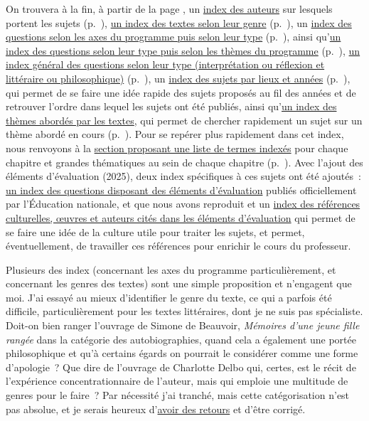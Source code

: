 On trouvera à la fin, à partir de la page \pageref{indexdeb}, un \hyperlink{indexa}{index des auteurs} sur lesquels portent les sujets (p.~\pageref{indexa}), \hyperlink{indexg}{un index des textes selon leur genre} (p.~\pageref{indexg}), 
un \hyperlink{indexw}{index des questions selon les axes du programme puis selon leur type} (p.~\pageref{indexw}), ainsi qu'\hyperlink{indexv}{un index des questions selon leur type puis selon les thèmes du programme} (p.~\pageref{indexv}), \hyperlink{indexq}{un index général des questions selon leur type (interprétation ou réflexion et littéraire ou philosophique)} (p.~\pageref{indexq}), un \hyperlink{indexn}{index des sujets par lieux et années} (p.~\pageref{indexn}), qui permet de se faire une idée rapide des sujets proposés au fil des années et de retrouver l'ordre dans lequel les sujets ont été publiés,  ainsi qu'\hyperlink{indext}{un index des thèmes abordés par les textes}, qui permet de chercher rapidement un sujet sur un thème abordé en cours (p.~\pageref{indext}). Pour se repérer plus rapidement dans cet index, nous renvoyons à la \hyperlink{repere-thematique}{section proposant une liste de termes indexés} pour chaque chapitre et grandes thématiques au sein de chaque chapitre (p.~\pageref{repere-thematique}). Avec l'ajout des éléments d'évaluation (2025), deux index spécifiques à ces sujets ont été ajoutés~: \hyperlink{indexc}{un index des questions disposant des éléments d'évaluation} publiés officiellement par l'Éducation nationale, et que nous avons reproduit et un \hyperlink{indexr}{index des références culturelles, œuvres et auteurs cités dans les éléments d'évaluation} qui permet de se faire une idée de la culture utile pour traiter les sujets, et permet, éventuellement, de travailler ces références pour enrichir le cours du professeur.

Plusieurs des index (concernant les axes du programme particulièrement, et concernant les genres des textes)
sont une simple proposition et n'engagent que moi.
J'ai essayé au mieux d'identifier le genre du texte, ce qui a parfois été difficile,
particulièrement pour les textes littéraires, dont je ne suis pas spécialiste.
Doit-on bien ranger l'ouvrage de Simone de Beauvoir, \textit{Mémoires d'une jeune fille rangée} dans la catégorie des autobiographies, quand cela a également une portée philosophique et qu'à certains égards on pourrait le considérer comme une forme d'apologie~? Que dire de l'ouvrage de Charlotte Delbo qui, certes, est le récit de l'expérience concentrationnaire de l'auteur, mais qui emploie une multitude de genres pour le faire~? Par nécessité j'ai tranché, mais cette catégorisation n'est pas absolue, et je serais heureux 
d'\href{mailto:mikael.quesseveur@ac-lille.fr}{avoir des retours}
et d'être corrigé.

